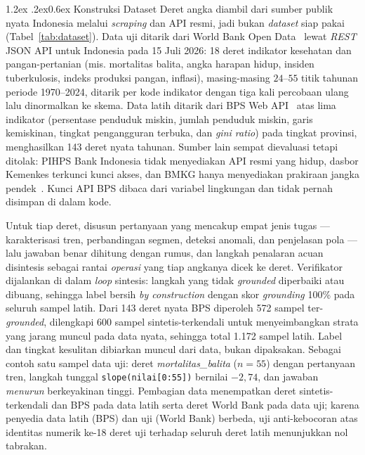 \documentclass[10pt,a4paper,twocolumn]{article}
\makeatletter
\renewcommand\subsection{\@startsection{subsection}{2}{\z@}%
  {1.2ex \@plus .2ex}{0.6ex}%
  {\normalfont\small\bfseries\itshape}}
\makeatother
\begin{document}
\subsection{Konstruksi Dataset}
Deret angka diambil dari sumber publik nyata Indonesia melalui \textit{scraping}
dan API resmi, jadi bukan \textit{dataset} siap pakai
(Tabel~\ref{tab:dataset}). Data uji ditarik dari World Bank Open
Data~\cite{worldbank} lewat \textit{REST} JSON API untuk Indonesia pada 15 Juli
2026: 18 deret indikator kesehatan dan pangan-pertanian (mis. mortalitas balita,
angka harapan hidup, insiden tuberkulosis, indeks produksi pangan, inflasi),
masing-masing $24$--$55$ titik tahunan periode 1970--2024, ditarik per kode
indikator dengan tiga kali percobaan ulang lalu dinormalkan ke skema. Data latih
ditarik dari BPS Web API~\cite{bps} atas lima indikator (persentase penduduk
miskin, jumlah penduduk miskin, garis kemiskinan, tingkat pengangguran terbuka,
dan \textit{gini ratio}) pada tingkat provinsi, menghasilkan 143 deret nyata
tahunan. Sumber lain sempat dievaluasi tetapi ditolak: PIHPS Bank
Indonesia tidak menyediakan API resmi yang hidup, dasbor Kemenkes terkunci kunci
akses, dan BMKG hanya menyediakan prakiraan jangka pendek~\cite{portalid}. Kunci API BPS dibaca dari variabel
lingkungan dan tidak pernah disimpan di dalam kode.

Untuk tiap deret, disusun pertanyaan yang mencakup empat jenis tugas ---
karakterisasi tren, perbandingan segmen, deteksi anomali, dan penjelasan pola ---
lalu jawaban benar dihitung dengan rumus, dan langkah penalaran acuan disintesis
sebagai rantai \textit{operasi} yang tiap angkanya dicek ke deret. Verifikator
dijalankan di dalam \textit{loop} sintesis: langkah yang tidak \textit{grounded}
diperbaiki atau dibuang, sehingga label bersih \textit{by construction} dengan
skor \textit{grounding} 100\% pada seluruh sampel latih. Dari 143 deret nyata BPS
diperoleh 572 sampel ter-\textit{grounded}, dilengkapi 600 sampel
sintetis-terkendali untuk menyeimbangkan strata yang jarang muncul pada data
nyata, sehingga total 1.172 sampel latih. Label dan tingkat kesulitan dibiarkan
muncul dari data, bukan dipaksakan. Sebagai contoh satu sampel data uji: deret
\textit{mortalitas\_balita} ($n{=}55$) dengan pertanyaan tren, langkah tunggal
\texttt{slope(nilai[0:55])} bernilai $-2,74$, dan jawaban \textit{menurun}
berkeyakinan tinggi. Pembagian data menempatkan deret sintetis-terkendali dan
BPS pada data latih serta deret World Bank pada data uji; karena penyedia data
latih (BPS) dan uji (World Bank) berbeda, uji anti-kebocoran atas identitas
numerik ke-18 deret uji terhadap seluruh deret latih menunjukkan nol tabrakan.
\end{document}
